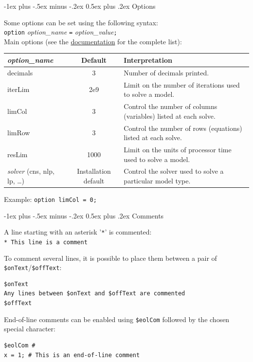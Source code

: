 \documentclass[10pt,landscape,a4paper]{article}
\makeatletter
\renewcommand{\section}{\@startsection{section}{1}{0mm}%
                                {-1ex plus -.5ex minus -.2ex}%
                                {0.5ex plus .2ex}%
                                {\color{blue}\normalfont\large\bfseries}}
\makeatother
\begin{document}
\begin{multicols}{2}
\section{Options}

Some options can be set using the following syntax:\\
\texttt{option} \emph{option\_name} \texttt{=} \emph{option\_value}\texttt{;}\\
Main options (see the
\href{https://www.gams.com/latest/docs/UG_OptionStatement.html}{documentation}
for the complete list):\\
\begin{tabularx}{\columnwidth}{@{}>{\ttfamily}lcX@{}}
  \emph{\textrm{option\_name}} & Default & Interpretation \\
  \toprule
  decimals & 3 & Number of decimals printed.\\
  iterLim& 2e9 & Limit on the number of iterations used to solve a model. \\
  limCol& 3 & Control the number of columns (variables) listed at each solve.\\
  limRow& 3 & Control the number of rows (equations) listed at each solve.\\
  resLim& 1000 & Limit on the units of processor time used to solve a model.\\
  \emph{\textrm{solver}} \textrm{(}cns\textrm{, }nlp\textrm{, }lp\textrm{, \ldots)}&
  Installation default& Control the solver used to solve a particular model type.
\end{tabularx}
Example: \texttt{option limCol = 0;}

\section{Comments}

A line starting with an asterisk '\verb!*!' is commented:\\
\verb!* This line is a comment!

To comment several lines, it is possible to place them between a pair of
\verb!$onText!/\verb!$offText!:\\
\begin{verbatim}
$onText
Any lines between $onText and $offText are commented
$offText
\end{verbatim}

End-of-line comments can be enabled using \verb!$eolCom! followed by the
chosen special character:\\
\begin{verbatim}
$eolCom #
x = 1; # This is an end-of-line comment
\end{verbatim}


\end{multicols}
\end{document}
